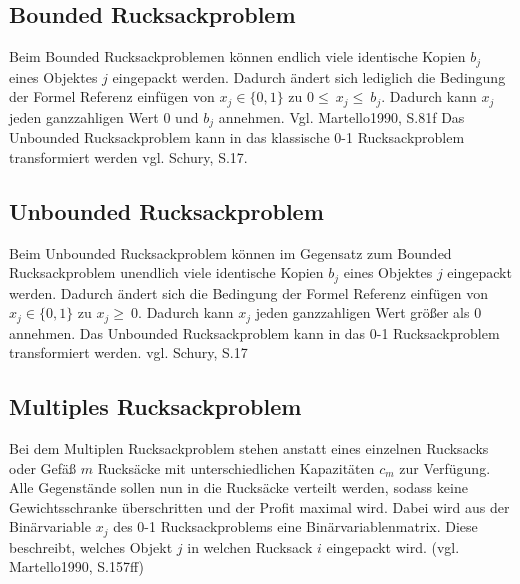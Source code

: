 \subsection{Bounded Rucksackproblem}
Beim Bounded Rucksackproblemen können endlich viele identische Kopien $b_j$ eines Objektes $j$ eingepackt werden. Dadurch ändert sich lediglich die Bedingung der Formel Referenz einfügen von $x_j\in\{0,1\}$ zu $0\le\ x_j\le\ b_j$. Dadurch kann $x_j$ jeden ganzzahligen Wert $0$ und $b_j$ annehmen. Vgl. Martello1990, S.81f Das Unbounded Rucksackproblem kann in das klassische 0-1 Rucksackproblem transformiert werden vgl. Schury, S.17.
\subsection{Unbounded Rucksackproblem}
Beim Unbounded Rucksackproblem können im Gegensatz zum Bounded Rucksackproblem unendlich viele identische Kopien $b_j$ eines Objektes $j$ eingepackt werden. Dadurch ändert sich die Bedingung der Formel Referenz einfügen von $x_j\in\{0,1\}$ zu $x_j\geq\ 0$. Dadurch kann $x_j$ jeden ganzzahligen Wert größer als $0$ annehmen. Das Unbounded Rucksackproblem kann in das 0-1 Rucksackproblem transformiert werden. vgl. Schury, S.17
\subsection{Multiples Rucksackproblem}
Bei dem Multiplen Rucksackproblem stehen anstatt eines einzelnen Rucksacks oder Gefäß $m$ Rucksäcke mit unterschiedlichen Kapazitäten $c_m$ zur Verfügung. Alle Gegenstände sollen nun in die Rucksäcke verteilt werden, sodass keine Gewichtsschranke überschritten und der Profit maximal wird. Dabei wird aus der Binärvariable $x_j$ des 0-1 Rucksackproblems eine Binärvariablenmatrix. Diese beschreibt, welches Objekt $j$ in welchen Rucksack $i$ eingepackt wird. (vgl. Martello1990, S.157ff)
